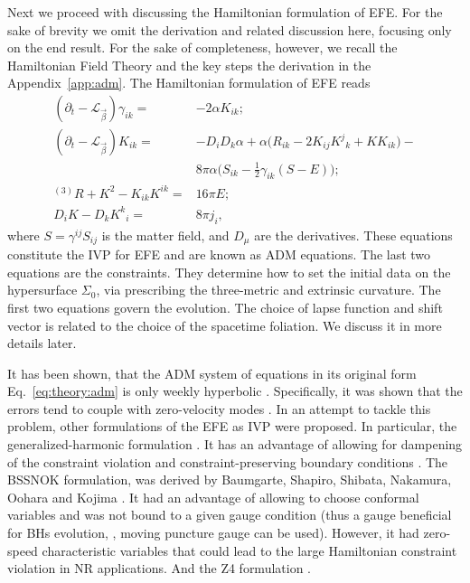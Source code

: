 Next we proceed with discussing the Hamiltonian formulation of \ac{EFE}.
For the sake of brevity we omit the derivation and related discussion here, 
focusing only on the end result. 
For the sake of completeness, however, we recall the Hamiltonian Field Theory
and the key steps the derivation in the Appendix~\ref{app:adm}.
%
The Hamiltonian formulation of \ac{EFE} reads 
%
\begin{equation}
\begin{aligned}
(\partial_t - \mathcal{L}_{\vec{\beta}})\gamma_{ik} =& -2\alpha K_{ik}; \\
(\partial_t - \mathcal{L}_{\vec{\beta}})K_{ik} =& -D_{i}D_{k}\alpha + \alpha\big(R_{ik} - 2K_{ij}{K^j}_k+KK_{ik}\big) - \\
& 8\pi\alpha\big(S_{ik} - \frac{1}{2}\gamma_{ik}(S-E)\big); \\
{^{(3)}R} + K^2 - K_{ik}K^{ik} =& 16\pi E; \\
D_{i}K-D_{k}{K^k}_i =& 8\pi j_i,
\end{aligned}
\end{equation}
%
where $S = \gamma^{ij} S_{ij}$ is the matter field, and 
$D_{\mu}$ are the derivatives.
%
These equations constitute the \ac{IVP} for \ac{EFE} and are known as \ac{ADM} equations. 
The last two equations are the constraints. They determine how to set the initial 
data on the hypersurface $\Sigma_0$, via prescribing the three-metric and extrinsic curvature. 
The first two equations govern the evolution.
The choice of lapse function and shift vector is related to the choice of the spacetime 
foliation. We discuss it in more details later.

It has been shown, that the \ac{ADM} system of equations in its original form Eq.~\eqref{eq:theory:adm} 
is only weekly hyperbolic \citep{Baumgarte:2002jm}. 
Specifically, it was shown that the  errors tend to couple with 
zero-velocity modes \citep{Alcubierre:1999rt}. 
%
In an attempt to tackle this problem, other formulations of the \ac{EFE} as \ac{IVP} were proposed. 
In particular, the generalized-harmonic formulation \citep{Friedrich:1986,Garfinkle:2001ni,Pretorius:2004jg,Lindblom:2005qh}. 
It has an advantage of allowing for dampening of the constraint violation \citep{Gundlach:2005eh} and
constraint-preserving boundary conditions \citep{Kreiss:2006mi,Rinne:2005df,Ruiz:2007hg}.
%
The BSSNOK formulation, was derived by Baumgarte, Shapiro, Shibata, Nakamura, Oohara and Kojima \citep{Nakamura1987,Shibata:1995we,Baumgarte:1998te}. It had an advantage of allowing to choose 
conformal variables and was not bound to a given gauge condition 
(thus a gauge beneficial for \acp{BH} evolution, \ie, moving puncture gauge can be used). 
However, it had zero-speed characteristic variables that could lead to the large 
Hamiltonian constraint violation in \ac{NR} applications.
%
And the Z4 formulation \citep{Bona:2003fj,Bernuzzi:2009ex,Ruiz:2010qj,Weyhausen:2011cg,Alic:2011gg}.

